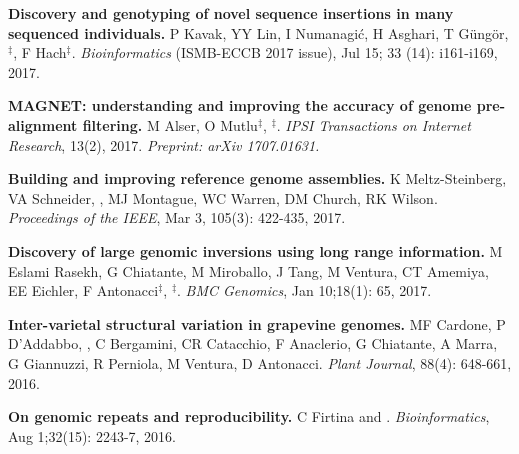   \vspace{-.2cm}
                                     

         {\bf Discovery and genotyping of novel sequence insertions in many sequenced individuals.}
         P Kavak, YY Lin, I Numanagić, H Asghari, T Güngör, \calkan{}$^\ddag$, F Hach$^\ddag$.
         {\em Bioinformatics} (ISMB-ECCB 2017 issue), Jul 15; 33 (14): i161-i169, 2017.\\
         
  \vspace{-.2cm}
                                       
         {\bf MAGNET: understanding and improving the accuracy of genome pre-alignment filtering.}
         M Alser, O Mutlu$^\ddag$, \calkan{}$^\ddag$. 
         {\em IPSI Transactions on Internet Research}, 13(2), 2017. \textit{Preprint: arXiv 1707.01631.}



         
  \vspace{-.2cm}        
         {\bf Building and improving reference genome assemblies.} K Meltz-Steinberg, VA Schneider, \calkan{}, MJ Montague, WC Warren, DM Church, RK Wilson.
         {\em Proceedings of the IEEE}, Mar 3, 105(3): 422-435, 2017.


  \vspace{-.2cm}        
         {\bf Discovery of large genomic inversions using long
range information.} M Eslami Rasekh, G Chiatante, M Miroballo, J Tang, M Ventura, CT Amemiya, EE Eichler, F Antonacci$^\ddag$, \calkan{}$^\ddag$.
         {\em BMC Genomics}, Jan 10;18(1): 65, 2017.

\clearpage

  \vspace{-.2cm}        
  {\bf Inter-varietal structural variation in grapevine genomes.}
 MF Cardone, P D'Addabbo, \calkan{}, C Bergamini, CR Catacchio, F Anaclerio, G Chiatante, A Marra, G Giannuzzi, R Perniola, M Ventura, D Antonacci.
 {\em Plant Journal}, 88(4): 648-661, 2016.

  \vspace{-.2cm}        
  {\bf On genomic repeats and reproducibility.}
  C Firtina and \calkan{}.
 {\em Bioinformatics}, Aug 1;32(15): 2243-7, 2016.

